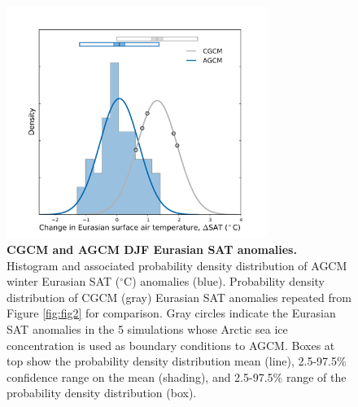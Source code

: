 \documentclass{nature}
\begin{document}
\begin{figure}%
\centering
\noindent\includegraphics[width=20pc]{Word/Figure_3.pdf}
\caption{\textbf{CGCM and AGCM DJF Eurasian SAT anomalies.} Histogram and associated probability density distribution of AGCM winter Eurasian SAT ($^\circ$C) anomalies (blue). Probability density distribution of CGCM (gray) Eurasian SAT anomalies repeated from Figure \ref{fig:fig2} for comparison. Gray circles indicate the Eurasian SAT anomalies in the 5 simulations whose Arctic sea ice concentration is used as boundary conditions to AGCM. Boxes at top show the probability density distribution mean (line), 2.5-97.5\% confidence range on the mean (shading), and 2.5-97.5\% range of the probability density distribution (box).
} %
\label{fig:fig3} 
\end{figure}
\end{document}
